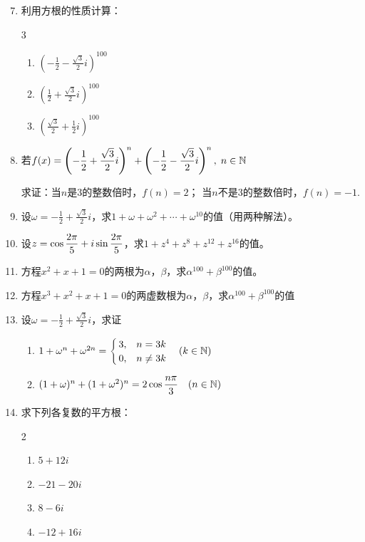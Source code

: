\begin{enumerate}\setcounter{enumi}{6}
    \item 利用方根的性质计算：
\begin{multicols}{3}
\begin{enumerate}[(1)]
    \item $\left(-\frac{1}{2}-\frac{\sqrt{3}}{2}i\right)^{100}$
    \item $\left(\frac{1}{2}+\frac{\sqrt{3}}{2}i\right)^{100}$
    \item $\left(\frac{\sqrt{3}}{2}+\frac{1}{2}i\right)^{100}$
\end{enumerate}
\end{multicols}
\item 若$f(x)=\left(-\dfrac{1}{2}+\dfrac{\sqrt{3}}{2}i\right)^n+\left(-\dfrac{1}{2}-\dfrac{\sqrt{3}}{2}i\right)^n,\; n\in\mathbb{N}$

求证：当$n$是3的整数倍时，$f(n)=2$；
当$n$不是3的整数倍时，$f(n)=-1$.
\item 设$\omega=-\frac{1}{2}+\frac{\sqrt{3}}{2}i$，求$1+\omega+\omega^2+\cdots+\omega^{10}$的值（用两种解法）。
\item 设$z=\cos\dfrac{2\pi}{5}+i\sin\dfrac{2\pi}{5}$，求$1+z^4+z^8+z^{12}+z^{16}$的值。
\item  方程$x^2+x+1=0$的两根为$\alpha$，$\beta$，求$\alpha^{100}+\beta^{100}$的值。
\item 方程$x^3+x^2+x+1=0$的两虚数根为$\alpha$，$\beta$，求$\alpha^{100}+\beta^{100}$的值
\item 设$\omega=-\frac{1}{2}+\frac{\sqrt{3}}{2}i$，求证
\begin{enumerate}[(1)]
    \item $1+\omega^n+\omega^{2n}=\begin{cases}
        3,& n=3k\\
        0,& n\ne 3k
    \end{cases}\quad (k\in\mathbb{N})$
\item $(1+\omega)^n+(1+\omega^2)^n=2\cos\dfrac{n\pi}{3}\quad (n\in\mathbb{N})$
\end{enumerate}

\item 求下列各复数的平方根：
\begin{multicols}{2}
\begin{enumerate}[(1)]
    \item $5+12i$
    \item $-21-20i$
    \item $8-6i$
    \item $-12+16i$
\end{enumerate}
\end{multicols}
\end{enumerate}

